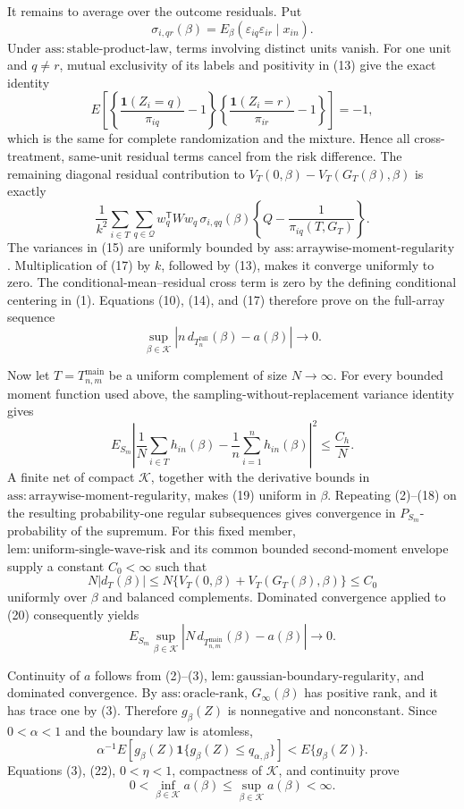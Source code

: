 It remains to average over the outcome residuals.  Put
\[
\sigma_{i,qr}(\beta)
=E_\beta(\varepsilon_{iq}\varepsilon_{ir}\mid x_{in}).
\tag{15}
\]
Under \(\mathrm{ass{:}stable\text{-}product\text{-}law}\), terms involving distinct units vanish.  For one unit and \(q\neq r\), mutual exclusivity of its labels and positivity in (13) give the exact identity
\[
E\!\left[
\left\{\frac{\mathbf 1(Z_i=q)}{\pi_{iq}}-1\right\}
\left\{\frac{\mathbf 1(Z_i=r)}{\pi_{ir}}-1\right\}
\right]=-1,
\tag{16}
\]
which is the same for complete randomization and the mixture.  Hence all cross-treatment, same-unit residual terms cancel from the risk difference.  The remaining diagonal residual contribution to \(V_T(0,\beta)-V_T(G_T(\beta),\beta)\) is exactly
\[
\frac1{k^2}\sum_{i\in T}\sum_{q\in\mathcal Q}
w_q^{\mathsf T}Ww_q\,\sigma_{i,qq}(\beta)
\left\{Q-\frac1{\pi_{iq}(T,G_T)}\right\}.
\tag{17}
\]
The variances in (15) are uniformly bounded by \(\mathrm{ass{:}arraywise\text{-}moment\text{-}regularity}\).  Multiplication of (17) by \(k\), followed by (13), makes it converge uniformly to zero.  The conditional-mean--residual cross term is zero by the defining conditional centering in (1).  Equations (10), (14), and (17) therefore prove on the full-array sequence
\[
\sup_{\beta\in\mathcal K}
\left|n\,d_{T_n^{\mathrm{full}}}(\beta)-a(\beta)\right|
\longrightarrow0.
\tag{18}
\]

Now let \(T=T_{n,m}^{\mathrm{main}}\) be a uniform complement of size \(N\to\infty\).  For every bounded moment function used above, the sampling-without-replacement variance identity gives
\[
E_{S_m}\left|
\frac1N\sum_{i\in T}h_{in}(\beta)
-\frac1n\sum_{i=1}^nh_{in}(\beta)
\right|^2\leq\frac{C_h}{N}.
\tag{19}
\]
A finite net of compact \(\mathcal K\), together with the derivative bounds in \(\mathrm{ass{:}arraywise\text{-}moment\text{-}regularity}\), makes (19) uniform in \(\beta\).  Repeating (2)--(18) on the resulting probability-one regular subsequences gives convergence in \(P_{S_m}\)-probability of the supremum.  For this fixed member, \(\mathrm{lem{:}uniform\text{-}single\text{-}wave\text{-}risk}\) and its common bounded second-moment envelope supply a constant \(C_0<\infty\) such that
\[
N|d_T(\beta)|
\leq N\{V_T(0,\beta)+V_T(G_T(\beta),\beta)\}
\leq C_0
\tag{20}
\]
uniformly over \(\beta\) and balanced complements.  Dominated convergence applied to (20) consequently yields
\[
E_{S_m}\sup_{\beta\in\mathcal K}
\left|N\,d_{T_{n,m}^{\mathrm{main}}}(\beta)-a(\beta)\right|
\longrightarrow0.
\tag{21}
\]

Continuity of \(a\) follows from (2)--(3), \(\mathrm{lem{:}gaussian\text{-}boundary\text{-}regularity}\), and dominated convergence.  By \(\mathrm{ass{:}oracle\text{-}rank}\), \(G_\infty(\beta)\) has positive rank, and it has trace one by (3).  Therefore \(g_\beta(Z)\) is nonnegative and nonconstant.  Since \(0<\alpha<1\) and the boundary law is atomless,
\[
\alpha^{-1}E\!\left[
g_\beta(Z)\mathbf 1\{g_\beta(Z)\leq q_{\alpha,\beta}\}
\right]
<E\{g_\beta(Z)\}.
\tag{22}
\]
Equations (3), (22), \(0<\eta<1\), compactness of \(\mathcal K\), and continuity prove
\[
0<\inf_{\beta\in\mathcal K}a(\beta)
\leq\sup_{\beta\in\mathcal K}a(\beta)<\infty.
\tag{23}
\]

